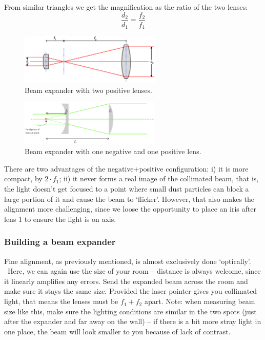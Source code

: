 \documentclass[a4paper]{report}
\begin{document}
	From similar triangles we get the magnification as the ratio of the two lenses:
	\begin{equation}
	\frac{d_2}{d_1}=\frac{f_2}{f_1}
	\label{eq:beamExp}
	\end{equation}

	\begin{figure}[h!]
		\center
		\includegraphics[width=0.6\textwidth]{beamExpander1.eps}
		\caption{Beam expander with two positive lenses.}
		\label{beamExpander1}
	\end{figure}

	\begin{figure}[h!]
		\center
		\includegraphics[width=0.6\textwidth]{beamExpander2.eps}
		\caption{Beam expander with one negative and one positive lens.}
		\label{beamExpander2}
	\end{figure}

	There are two advantages of the negative+positive configuration: i) it is more compact, by $2\cdot f_1$; ii) it never forms a real image of the collimated beam, that is, the light doesn't get focused to a point where small dust particles can block a large portion of it and cause the beam to `flicker'.
	However, that also makes the alignment more challenging, since we loose the opportunity to place an iris after lens 1 to ensure the light is on axis.


	\subsubsection{Building a beam expander}
	Fine alignment, as previously mentioned, is almost exclusively done `optically'. \
	Here, we can again use the size of your room -- distance is always welcome, since it linearly amplifies any errors.
	Send the expanded beam across the room and make sure it stays the same size.
	Provided the laser pointer gives you collimated light, that means the lenses must be $f_1+f_2$ apart.
	Note: when measuring beam size like this, make sure the lighting conditions are similar in the two spots (just after the expander and far away on the wall) -- if there is a bit more stray light in one place, the beam will look smaller to you because of lack of contrast.
\end{document}
